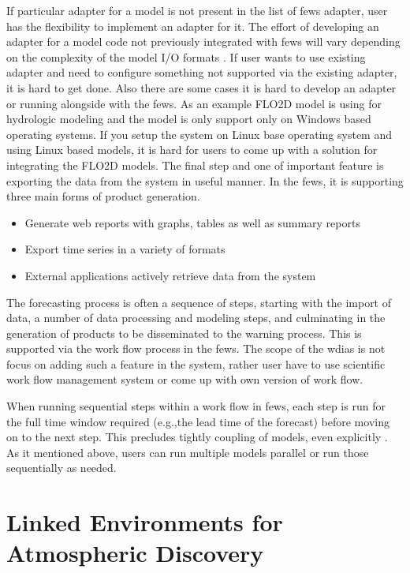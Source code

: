 \documentclass[a4paper,oneside,12pt]{report}
\begin{document}
If particular adapter for a model is not present in the list of \acrshort{fews} adapter, user has the flexibility to implement an adapter for it. The effort of developing an adapter for a model code not previously integrated with \acrshort{fews} will vary depending on the complexity of the model I/O formats \cite{Werner2013TheSystem}. If user wants to use existing adapter and need to configure something not supported via the existing adapter, it is hard to get done. Also there are some cases it is hard to develop an adapter or running alongside with the \acrshort{fews}. As an example FLO2D model is using for hydrologic modeling and the model is only support only on Windows based operating systems. If you setup the system on Linux base operating system and using Linux based models, it is hard for users to come up with a solution for integrating the FLO2D models.
The final step and one of important feature is exporting the data from the system in useful manner. In the \acrshort{fews}, it is supporting three main forms of product generation.
\begin{itemize}
\item Generate web reports with graphs, tables as well as summary reports
\item Export time series in a variety of formats
\item External applications actively retrieve data from the system
\end{itemize}
The forecasting process is often a sequence of steps, starting with the import of data, a number of data processing and modeling steps, and culminating in the generation of products to be disseminated to the warning process. This is supported via the work flow process in the \acrshort{fews}. The scope of the \acrshort{wdias} is not focus on adding such a feature in the system, rather user have to use scientific work flow management system or come up with own version of work flow.

When running sequential steps within a work flow in \acrshort{fews}, each step is run for the full time window required (e.g.,the lead time of the forecast) before moving on to the next step. This precludes tightly coupling of models, even explicitly \cite{Werner2013TheSystem}. As it mentioned above, users can run multiple models parallel or run those sequentially as needed. 

\section{Linked Environments for Atmospheric Discovery}
\end{document}
